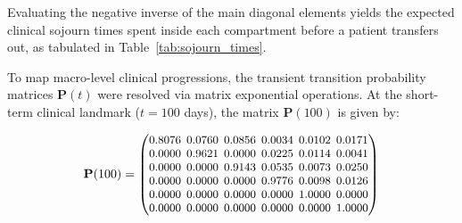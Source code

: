 \documentclass[9pt,a4paper,twocolumn,twoside]{rho-class/rho}
\begin{document}
        Evaluating the negative inverse of the main diagonal elements yields the expected clinical sojourn times spent inside each compartment before a patient transfers out, as tabulated in Table~\ref{tab:sojourn_times}.
        \begin{table}[H]
        \centering
        \caption{Expected Sojourn Times Across Transient Clinical States}
        \label{tab:sojourn_times}
        \end{table}

        To map macro-level clinical progressions, the transient transition probability matrices $\mathbf{P}(t)$ were resolved via matrix exponential operations. At the short-term clinical landmark ($t = 100$ days), the matrix $\mathbf{P}(100)$ is given by:

        \begin{equation}
        \small
        \setlength{\arraycolsep}{2.2pt}
        \mathbf{P}(100)=
        \begin{pmatrix}
        0.8076 & 0.0760 & 0.0856 & 0.0034 & 0.0102 & 0.0171\\
        0.0000 & 0.9621 & 0.0000 & 0.0225 & 0.0114 & 0.0041\\
        0.0000 & 0.0000 & 0.9143 & 0.0535 & 0.0073 & 0.0250\\
        0.0000 & 0.0000 & 0.0000 & 0.9776 & 0.0098 & 0.0126\\
        0.0000 & 0.0000 & 0.0000 & 0.0000 & 1.0000 & 0.0000\\
        0.0000 & 0.0000 & 0.0000 & 0.0000 & 0.0000 & 1.0000
        \end{pmatrix}
        \end{equation}
\end{document}

